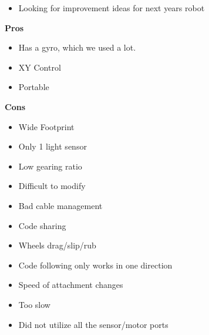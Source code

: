 
\begin{itemize}
  \item Looking for improvement ideas for next years robot
\end{itemize}

\textbf{Pros}

\begin{itemize}
  \item Has a gyro, which we used a lot.
  \item XY Control
  \item Portable
\end{itemize}

\textbf{Cons}

\begin{itemize}
  \item Wide Footprint
  \item Only 1 light sensor
  \item Low gearing ratio
  \item Difficult to modify
  \item Bad cable management
  \item Code sharing
  \item Wheels drag/slip/rub
  \item Code following only works in one direction
  \item Speed of attachment changes
  \item Too slow 
  \item Did not utilize all the sensor/motor ports
\end{itemize}

